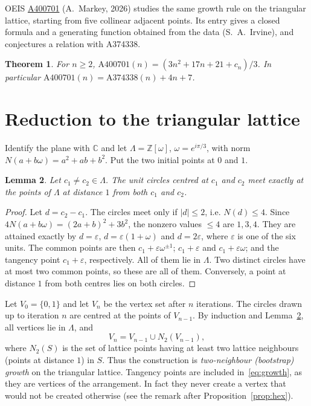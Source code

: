 \documentclass[11pt,a4paper]{amsart}
\newtheorem{theorem}{Theorem}
\newtheorem{lemma}[theorem]{Lemma}
\theoremstyle{definition}
\theoremstyle{remark}
\newcommand{\oeis}[1]{\href{https://oeis.org/#1}{#1}}
\newcommand{\Z}{\mathbb{Z}}
\begin{document}
OEIS \oeis{A400701} (A.~Markey, 2026) studies the same growth rule on the triangular lattice, starting from five collinear adjacent points. Its entry gives a closed formula and a generating function obtained from the data (S.~A.~Irvine), and conjectures a relation with A374338.

\begin{theorem}\label{thm:markey}
For $n\ge2$, $\mathrm{A400701}(n)=(3n^2+17n+21+c_n)/3$. In particular $\mathrm{A400701}(n)=\mathrm{A374338}(n)+4n+7$.
\end{theorem}

\section{Reduction to the triangular lattice}

Identify the plane with $\mathbb{C}$ and let $\Lambda=\Z[\omega]$, $\omega=e^{i\pi/3}$, with norm $N(a+b\omega)=a^2+ab+b^2$. Put the two initial points at $0$ and $1$.

\begin{lemma}\label{lem:lattice}
Let $c_1\ne c_2\in\Lambda$. The unit circles centred at $c_1$ and $c_2$ meet exactly at the points of $\Lambda$ at distance $1$ from both $c_1$ and $c_2$.
\end{lemma}

\begin{proof}
Let $d=c_2-c_1$. The circles meet only if $|d|\le2$, i.e. $N(d)\le4$. Since $4N(a+b\omega)=(2a+b)^2+3b^2$, the nonzero values $\le4$ are $1,3,4$. They are attained exactly by $d=\varepsilon$, $d=\varepsilon(1+\omega)$ and $d=2\varepsilon$, where $\varepsilon$ is one of the six units. The common points are then $c_1+\varepsilon\omega^{\pm1}$; $c_1+\varepsilon$ and $c_1+\varepsilon\omega$; and the tangency point $c_1+\varepsilon$, respectively. All of them lie in $\Lambda$. Two distinct circles have at most two common points, so these are all of them. Conversely, a point at distance $1$ from both centres lies on both circles.
\end{proof}

Let $V_0=\{0,1\}$ and let $V_n$ be the vertex set after $n$ iterations. The circles drawn up to iteration $n$ are centred at the points of $V_{n-1}$. By induction and Lemma~\ref{lem:lattice}, all vertices lie in $\Lambda$, and
\begin{equation}\label{eq:growth}
V_n=V_{n-1}\cup N_2(V_{n-1}),
\end{equation}
where $N_2(S)$ is the set of lattice points having at least two lattice neighbours (points at distance $1$) in $S$. Thus the construction is \emph{two-neighbour (bootstrap) growth} on the triangular lattice. Tangency points are included in~\eqref{eq:growth}, as they are vertices of the arrangement. In fact they never create a vertex that would not be created otherwise (see the remark after Proposition~\ref{prop:hex}).
\end{document}
